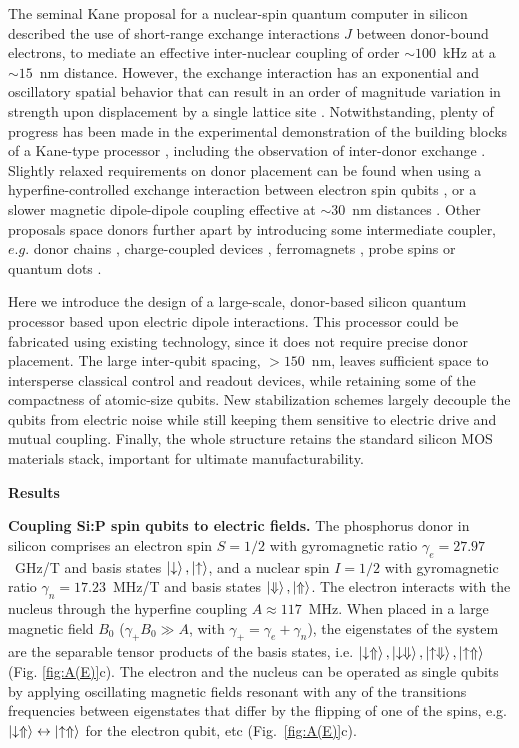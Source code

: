 \documentclass[aps,prb,superscriptaddress,nobibnotes,twocolumn]{revtex4-1}
\begin{document}
The seminal Kane proposal \cite{Kane1998} for a nuclear-spin quantum computer in silicon described the use of short-range exchange interactions $J$ between donor-bound electrons, to mediate an effective inter-nuclear coupling of order $\sim 100$~kHz at a $\sim 15$~nm distance. However, the exchange interaction has an exponential and oscillatory spatial behavior that can result in an order of magnitude variation in strength upon displacement by a single lattice site \cite{Koiller2002,Song2016}. Notwithstanding, plenty of progress has been made in the experimental demonstration of the building blocks of a Kane-type processor \cite{Morello2010,Pla2012,Pla2013,Laucht2015}, including the observation of inter-donor exchange \cite{Dehollain2014,Gonzalez2014,Weber2014}. Slightly relaxed requirements on donor placement can be found when using a hyperfine-controlled exchange interaction between electron spin qubits \cite{Kalra2014}, or a slower magnetic dipole-dipole coupling effective at $\sim 30$~nm distances \cite{Hill2015}. Other proposals space donors further apart by introducing some intermediate coupler, $e.g.$ donor chains \cite{Hollenberg2006,Mohiyaddin2016}, charge-coupled devices \cite{Morton2009}, ferromagnets \cite{Trifunovic2013}, probe spins \cite{Ogorman2014} or quantum dots \cite{Pica2015}.

Here we introduce the design of a large-scale, donor-based silicon quantum processor based upon electric dipole interactions. This processor could be fabricated using existing technology, since it does not require precise donor placement. The large inter-qubit spacing, $>150$~nm, leaves sufficient space to intersperse classical control and readout devices, while retaining some of the compactness of atomic-size qubits. New stabilization schemes largely decouple the qubits from electric noise while still keeping them sensitive to electric drive and mutual coupling. Finally, the whole structure retains the standard silicon MOS materials stack, important for ultimate manufacturability.


\vspace{3mm}
\noindent\textbf{\large Results}

\noindent\textbf{Coupling Si:P spin qubits to electric fields.}
%
The phosphorus donor in silicon comprises an electron spin $S = 1/2$ with gyromagnetic ratio $\gamma_e=27.97$~GHz/T and basis states $\ket{\downarrow}, \ket{\uparrow}$, and a nuclear spin $I = 1/2$ with gyromagnetic ratio $\gamma_n=17.23$~MHz/T and basis states $\ket{\Downarrow}, \ket{\Uparrow}$. The electron interacts with the nucleus through the hyperfine coupling $A\approx 117$~MHz. When placed in a large magnetic field $B_0$ ($\gamma_+ B_0 \gg A$, with $\gamma_+=\gamma_e+\gamma_n$), the eigenstates of the system are the separable tensor products of the basis states, i.e. $\ket{\downarrow \Uparrow}, \ket{\downarrow \Downarrow}, \ket{\uparrow \Downarrow}, \ket{\uparrow \Uparrow}$ (Fig. \ref{fig:A(E)}c). The electron and the nucleus can be operated as single qubits by applying oscillating magnetic fields resonant with any of the transitions frequencies between eigenstates that differ by the flipping of one of the spins, e.g. $\ket{\downarrow \Uparrow} \leftrightarrow \ket{\uparrow \Uparrow}$ for the electron qubit, etc (Fig.~\ref{fig:A(E)}c).
\end{document}
